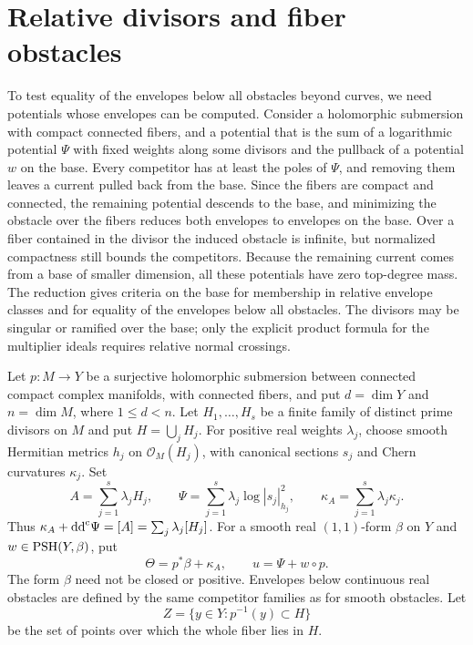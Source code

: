 \section{Relative divisors and fiber obstacles}
\label{subsec:fibration-obstacle-reduction}

To test equality of the envelopes below all obstacles beyond curves, we need potentials whose envelopes can be computed. Consider a holomorphic submersion with compact connected fibers, and a potential that is the sum of a logarithmic potential $\Psi$ with fixed weights along some divisors and the pullback of a potential $w$ on the base. Every competitor has at least the poles of $\Psi$, and removing them leaves a current pulled back from the base. Since the fibers are compact and connected, the remaining potential descends to the base, and minimizing the obstacle over the fibers reduces both envelopes to envelopes on the base. Over a fiber contained in the divisor the induced obstacle is infinite, but normalized compactness still bounds the competitors. Because the remaining current comes from a base of smaller dimension, all these potentials have zero top-degree mass. The reduction gives criteria on the base for membership in relative envelope classes and for equality of the envelopes below all obstacles. The divisors may be singular or ramified over the base; only the explicit product formula for the multiplier ideals requires relative normal crossings.

Let $p\colon M\to Y$ be a surjective holomorphic submersion between connected compact complex manifolds, with connected fibers, and put $d=\dim Y$ and $n=\dim M$, where $1\leq d<n$. Let $H_1,\ldots,H_s$ be a finite family of distinct prime divisors on $M$ and put $H=\bigcup_jH_j$. For positive real weights $\lambda_j$, choose smooth Hermitian metrics $h_j$ on $\mathcal O_M(H_j)$, with canonical sections $s_j$ and Chern curvatures $\kappa_j$. Set
\[
 A=\sum_{j=1}^s\lambda_jH_j,\qquad
 \Psi=\sum_{j=1}^s\lambda_j\log|s_j|_{h_j}^2,\qquad
 \kappa_A=\sum_{j=1}^s\lambda_j\kappa_j.
\]
Thus $\kappa_A+\mathrm{dd}^{\mathrm{c}}\Psi=[A]=\sum_j\lambda_j[H_j]$.
For a smooth real $(1,1)$-form $\beta$ on $Y$ and $w\in\mathrm{PSH}(Y,\beta)$, put
\[
 \Theta=p^*\beta+\kappa_A,\qquad u=\Psi+w\circ p.
\]
The form $\beta$ need not be closed or positive. Envelopes below continuous real obstacles are defined by the same competitor families as for smooth obstacles. Let
\[
 Z=\{y\in Y:p^{-1}(y)\subset H\}
\]
be the set of points over which the whole fiber lies in $H$.

